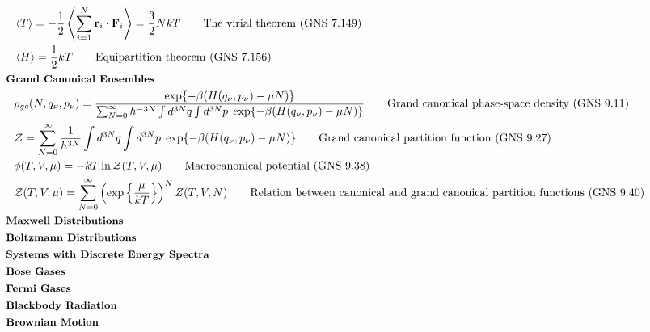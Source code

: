 \documentclass[10pt]{article}
\newcommand{\ve}[1]{\boldsymbol{\mathbf{#1}}}
\newcommand{\lrp}[1]{\left( #1 \right)}
\newcommand{\lrc}[1]{\left\{ #1 \right\}}
\begin{document}
\begin{multicols}{2}
\begin{align*}
		& \expval{T} = - \frac{1}{2} \expval{\sum_{i=1}^N \ve{r}_i \cdot \ve{F}_i} = \frac{3}{2} NkT	\tag*{The virial theorem (GNS 7.149)} \\
		& \expval{H} = \frac{1}{2} kT	\tag*{Equipartition theorem (GNS 7.156)} \\
	& \small \hspace{-7pt} \textbf{Grand Canonical Ensembles} \small \\
		& \rho_{gc}(N, q_\nu, p_\nu) = \frac{\exp \{ -\beta(H(q_\nu, p_\nu) -\mu N) \}}{\sum_{N=0}^{\infty} h^{-3N} \int d^{3N} q \int d^{3N}p \; \exp \{ -\beta(H(q_\nu, p_\nu) -\mu N) \}} \tag*{Grand canonical phase-space density (GNS 9.11)} \\
		& \mathcal{Z} = \sum_{N=0}^{\infty} \frac{1}{h^{3N}} \int d^{3N}q  \int d^{3N}p \; \exp \{ -\beta(H(q_\nu, p_\nu) -\mu N) \}	\tag*{Grand canonical partition function (GNS 9.27)} \\
		& \phi(T,V,\mu) = -kT \ln \mathcal{Z}(T,V,\mu)	\tag*{Macrocanonical potential (GNS 9.38)} \\
		& \mathcal{Z}(T,V,\mu) = \sum_{N=0}^{\infty} \lrp{\exp\lrc{\frac{\mu}{kT}}}^N Z(T,V,N)	\tag*{Relation between canonical and grand canonical partition functions (GNS 9.40)} \\
	& \small \hspace{-7pt} \textbf{Maxwell Distributions} \small \\
	& \small \hspace{-7pt} \textbf{Boltzmann Distributions} \small \\
	& \small \hspace{-7pt} \textbf{Systems with Discrete Energy Spectra} \small \\
	& \small \hspace{-7pt} \textbf{Bose Gases} \small \\
	& \small \hspace{-7pt} \textbf{Fermi Gases} \small \\
	& \small \hspace{-7pt} \textbf{Blackbody Radiation} \small \\
	& \small \hspace{-7pt} \textbf{Brownian Motion} \small \\
	\end{align*}
	
\end{multicols}
 
\end{document}
